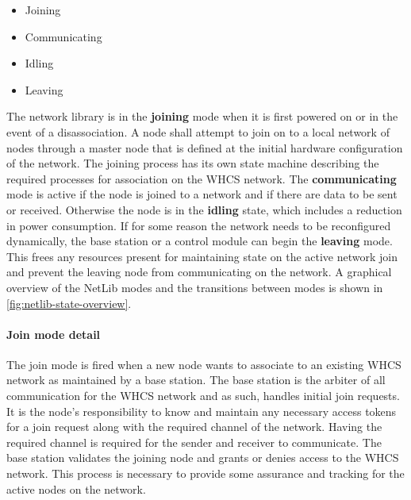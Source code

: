 \begin{itemize}
  \item Joining
  \item Communicating
  \item Idling
  \item Leaving
\end{itemize}

The network library is in the \textbf{joining} mode when it is first
powered on or in the event of a disassociation. A node shall attempt to join
on to a local network of nodes through a master node that is defined at the
initial hardware configuration of the network. The joining process has
its own state machine describing the required processes for association on the
WHCS network. The \textbf{communicating} mode is active if the node is
joined to a network and if there are data to be sent or received. Otherwise the
node is in the \textbf{idling} state, which includes a reduction in
power consumption. If for some reason the network needs to be reconfigured
dynamically, the base station or a control module can begin the
\textbf{leaving} mode. This frees any resources present for maintaining
state on the active network join and prevent the leaving node from
communicating on the network. A graphical overview of the NetLib modes and the
transitions between modes is shown in \autoref{fig:netlib-state-overview}.


\paragraph{Join mode detail}
The join mode is fired when a new node wants to associate to an existing
WHCS network as maintained by a base station. The base station is the
arbiter of all communication for the WHCS network and as such, handles
initial join requests. It is the node's responsibility to know and maintain any
necessary access tokens for a join request along with the required channel of
the network. Having the required channel is required for the sender and
receiver to communicate. The base station validates the joining
node and grants or denies access to the WHCS network. This process is necessary to
provide some assurance and tracking for the active nodes on the network.

